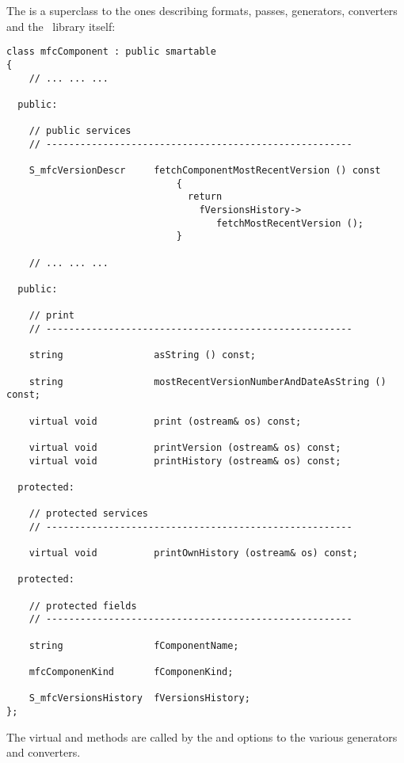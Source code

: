 The  is a superclass to the ones describing formats, passes, generators, converters and the \mf\ library itself:
\begin{lstlisting}[language=CPlusPlus]
class mfcComponent : public smartable
{
	// ... ... ...

  public:

    // public services
    // ------------------------------------------------------

    S_mfcVersionDescr     fetchComponentMostRecentVersion () const
                              {
                                return
                                  fVersionsHistory->
                                     fetchMostRecentVersion ();
                              }

	// ... ... ...

  public:

    // print
    // ------------------------------------------------------

    string                asString () const;

    string                mostRecentVersionNumberAndDateAsString () const;

    virtual void          print (ostream& os) const;

    virtual void          printVersion (ostream& os) const;
    virtual void          printHistory (ostream& os) const;

  protected:

    // protected services
    // ------------------------------------------------------

    virtual void          printOwnHistory (ostream& os) const;

  protected:

    // protected fields
    // ------------------------------------------------------

    string                fComponentName;

    mfcComponenKind       fComponenKind;

    S_mfcVersionsHistory  fVersionsHistory;
};
\end{lstlisting}

The virtual  and  methods are called by the  and  options to the various generators and converters.


